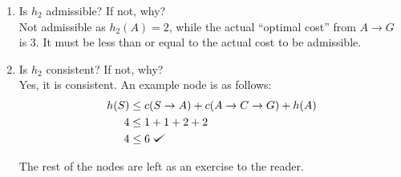 \documentclass[11pt]{article}
\def\checkmark{\tikz\fill[scale=0.4](0,.35) -- (.25,0) -- (1,.7) -- (.25,.15) -- cycle;}
\begin{document}
\begin{description}
\begin{enumerate}
     \item Is $h_2$ admissible?  If not, why? \\

       Not admissible as $h_{2}(A) = 2$, while the actual ``optimal cost'' from $A \rightarrow G$ is 3. It must be less than or equal to the actual cost to be admissible.

     \item Is $h_2$ consistent?  If not, why? \\

       Yes, it is consistent. An example node is as follows:
       \begin{align*}
         h(S) &\leq c(S\rightarrow A) + c(A\rightarrow C \rightarrow G) + h(A)\\
         4 &\leq 1+1+2+2\\
         4 &\leq 6\;\checkmark
         \end{align*}

         The rest of the nodes are left as an exercise to the reader.


     \end{enumerate}

  \end{description}
\end{document}
